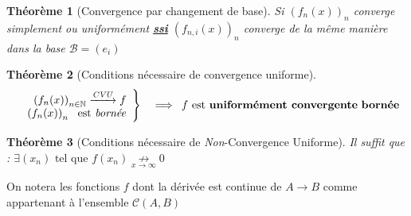 \documentclass[11pt,a4paper]{report}
\newtheorem{theorem}{Théorème}[chapter]
\theoremstyle{definition}
\begin{document}
\begin{theorem}[Convergence par changement de base]
Si $\left(f_n(x)\right)_n$ converge simplement ou uniformément \uline{\textbf{ssi}} $\left(f_{n,i}(x)\right)_n$ converge de la même manière dans la base $\mathcal{B}=(e_i)$
\end{theorem}
\begin{theorem}[Conditions nécessaire de convergence uniforme]
\[
\begin{array}{r c}

\left.
\begin{array}{r}
\left(f_n(x)\right)_{n\in\mathbb{N}}\xrightarrow{\emph{CVU}}f\\
\left(f_n(x)\right)_n\ \text{ est \emph{bornée}}\\
\end{array}\right\rbrace & \implies
\end{array}
f \text{ est \textbf{uniformément convergente} \textbf{bornée}}
\]
\end{theorem}
\begin{theorem}[Conditions nécessaire de \emph{Non}-Convergence Uniforme]
Il suffit que : 
$\exists (x_n)\text{ tel que }f(x_n)\underset{x\to{}\infty}{\nrightarrow}0$
\end{theorem}
On notera les fonctions $f$ dont la dérivée est continue de $A\to B$ comme appartenant à l'ensemble $\mathcal{C}(A,B)$
\end{document}
